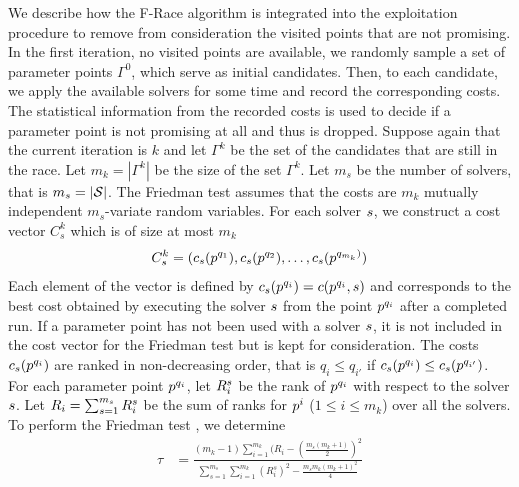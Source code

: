 We describe how the F-Race algorithm is integrated into the exploitation procedure to remove from consideration the visited points that are not promising. In the first iteration, no visited points are available, we randomly sample a set of parameter points $\Gamma^0$, which serve as initial candidates. Then, to each candidate, we apply the available solvers for some time and record the corresponding costs. The statistical information from the recorded costs is used to decide if a parameter point is not promising at all and thus is dropped. Suppose again that the current iteration is $k$ and let $\Gamma^k$ be the set of the candidates that are still in the race. Let $m_k = | \Gamma^k | $ be the size of the set $\Gamma^k$. Let $m_s$ be the number of solvers, that is $m_s = | \mathcal{S}|$. The Friedman test assumes that the costs are $m_k$ mutually independent $m_s$-variate random variables. For each solver $s$, we construct a cost vector $C^k_s$ which is of size at most $m_k$
\begin{eqnarray}\label{eq:C}
C^k_s = (c_{s}(p^{q_1}), c_{s}(p^{q_2}), \ldots, c_{s}(p^{q_{m_k})})
\end{eqnarray}
Each element of the vector is defined by $c_{s}(p^{q_i}) = c(p^{q_i}, s)$ and corresponds to the best cost obtained by executing the solver $s$ from the point $p^{q_i}$ after a completed run. If a parameter point has not been used with a solver $s$, it is not included in the cost vector for the Friedman test but is kept for consideration. The costs $c_{s}(p^{q_i})$ are ranked in non-decreasing order, that is $q_i \le q_{i'}$ if $c_{s}(p^{q_i}) \le c_{s}(p^{q_{i'}})$. For each parameter point $p^{q_i}$, let $R^{s}_{i}$ be the rank of $p^{q_i}$ with respect to the solver $s$. Let $R_{i} =  \sum_{s=1}^{m_s} R^{s}_{i}$ be the sum of ranks for $p^i$ ($1 \leq i \leq m_k$) over all the solvers. To perform the Friedman test \cite{GVK24551600X}, we determine
\begin{eqnarray*}
\displaystyle \tau & = \displaystyle{ \frac{ (m_k-1) \sum_{i=1}^{m_k} (R_i - (\frac{m_s(m_k+1)}{2})^2 } {\sum_{s=1}^{m_s} \sum_{i=1}^{m_k}  (R^s_{i})^2 -  \frac{m_s m_k (m_k+1)^2}{4} }}  \nonumber \\ 
\end{eqnarray*}
